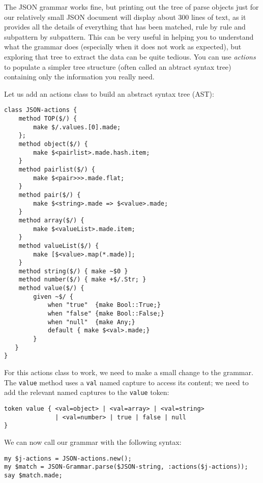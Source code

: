 The JSON grammar works fine, but printing out the tree of 
parse objects just for our relatively small JSON document 
will display about 300 lines of text, as 
it provides all the details of everything that has been 
matched, rule by rule and subpattern by subpattern. This 
can be very useful in helping you to understand what the grammar does 
(especially when it does not work as expected), but 
exploring that tree to extract the data can be quite 
tedious. You can use \emph{actions} to populate a simpler 
tree structure (often called an abtract syntax tree) containing 
only the information you really need. 

Let us add an actions class to build an abstract syntax tree 
(AST):

\begin{verbatim}
class JSON-actions {
    method TOP($/) {
        make $/.values.[0].made;
    };
    method object($/) {
        make $<pairlist>.made.hash.item;
    }
    method pairlist($/) {
        make $<pair>>>.made.flat;
    }
    method pair($/) {
        make $<string>.made => $<value>.made;
    }
    method array($/) {
        make $<valueList>.made.item;
    }
    method valueList($/) {
        make [$<value>.map(*.made)];
    }
    method string($/) { make ~$0 }
    method number($/) { make +$/.Str; }
    method value($/) { 
        given ~$/ {
            when "true"  {make Bool::True;}
            when "false" {make Bool::False;}
            when "null"  {make Any;}
            default { make $<val>.made;}
        }  
   }
}
\end{verbatim}

For this actions class to work, we need to make a small change 
to the grammar. The {\tt value} method uses a {\tt val} named 
capture to access its content; we need to add the relevant 
named captures to the {\tt value} token:

\begin{verbatim}
token value { <val=object> | <val=array> | <val=string> 
              | <val=number> | true | false | null
}
\end{verbatim}

We can now call our grammar with the following syntax:

\begin{verbatim}
my $j-actions = JSON-actions.new();
my $match = JSON-Grammar.parse($JSON-string, :actions($j-actions));
say $match.made;
\end{verbatim}

